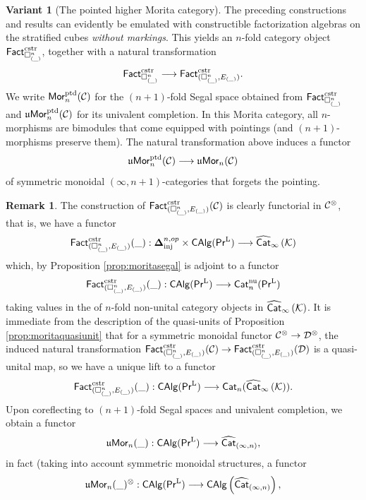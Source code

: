 \documentclass[10pt, reqno, twoside
, final
]{amsart}
\numberwithin{equation}{subsection}%
\theoremstyle{definition}
\theoremstyle{definition}
\theoremstyle{definition}
\theoremstyle{definition}
\theoremstyle{definition}
\theoremstyle{definition}
\theoremstyle{definition}
\newtheorem{var}[defn]{Variant}
\theoremstyle{definition}
\theoremstyle{definition}
\theoremstyle{plain}
\theoremstyle{definition}
\theoremstyle{plain}
\theoremstyle{definition}
\theoremstyle{plain}
\theoremstyle{definition}
\newtheorem{rmk}[defn]{Remark}
\theoremstyle{definition}
\theoremstyle{plain}
\theoremstyle{plain}
\theoremstyle{definition}
\theoremstyle{plain}
\theoremstyle{plain}
\theoremstyle{plain}
\begin{document}
\begin{var}[The pointed higher Morita category]
The preceding constructions and results can evidently be emulated with constructible factorization algebras on the stratified cubes \emph{without markings}. This yields an $n$-fold category object $\mathsf{Fact}^{\mathrm{cstr}}_{\square^n_{(\_)}}$, together with a natural transformation  
\[ \mathsf{Fact}^{\mathrm{cstr}}_{\square^n_{(\_)}}\longrightarrow  \mathsf{Fact}^{\mathrm{cstr}}_{(\square^n_{(\_)},E_{(\_)})}.  \]    
We write $\mathsf{Mor}^{\mathrm{ptd}}_n(\mathcal{C})$ for the $(n+1)$-fold Segal space obtained from $\mathsf{Fact}^{\mathrm{cstr}}_{\square^n_{(\_)}}$ and $\mathfrak{u}\mathsf{Mor}_n^{\mathrm{ptd}}(\mathcal{C})$ for its univalent completion. In this Morita category, all $n$-morphisms are bimodules that come equipped with pointings (and $(n+1)$-morphisms preserve them). The natural transformation above induces a functor 
\[ \mathfrak{u}\mathsf{Mor}^{\mathrm{ptd}}_n(\mathcal{C})\longrightarrow\mathfrak{u}\mathsf{Mor}_n(\mathcal{C})  \]
of symmetric monoidal $(\infty,n+1)$-categories that forgets the pointing.
\end{var}
\begin{rmk}
The construction of $\mathsf{Fact}^{\mathrm{cstr}}_{(\square^n_{(\_)},E_{(\_)}) }(\mathcal{C})$ is clearly functorial in $\mathcal{C}^{\otimes}$, that is, we have a functor
\[\mathsf{Fact}^{\mathrm{cstr}}_{(\square^n_{(\_)},E_{(\_)}) }(\_): \boldsymbol{\Delta}^{n,op}_{\mathrm{inj}}\times  \mathsf{CAlg}(\mathsf{Pr}^{\mathrm{L}})\longrightarrow \widehat{\mathsf{Cat}}_{\infty}\left(\mathcal{K}\right) \]
which, by Proposition \ref{prop:moritasegal} is adjoint to a functor
\[  \mathsf{Fact}^{\mathrm{cstr}}_{(\square^n_{(\_)},E_{(\_)}) }(\_):\mathsf{CAlg}(\mathsf{Pr}^{\mathrm{L}})\longrightarrow \mathsf{Cat}^{\mathrm{nu}}_n(\mathsf{Pr}^{\mathrm{L}}) \]
taking values in the \infcat of $n$-fold non-unital category objects in $\widehat{\mathsf{Cat}}_{\infty}\left(\mathcal{K}\right)$. 
It is immediate from the description of the quasi-units of Proposition \ref{prop:moritaquasiunit} that for a symmetric monoidal functor $\mathcal{C}^{\otimes}\rightarrow\mathcal{D}^{\otimes}$, the induced natural transformation $\mathsf{Fact}^{\mathrm{cstr}}_{(\square^n_{(\_)},E_{(\_)}) }(\mathcal{C})\rightarrow \mathsf{Fact}^{\mathrm{cstr}}_{(\square^n_{(\_)},E_{(\_)}) }(\mathcal{D})$ is a quasi-unital map, so we have a unique lift to a functor
\[  \mathsf{Fact}^{\mathrm{cstr}}_{(\square^n_{(\_)},E_{(\_)}) }(\_): \mathsf{CAlg}(\mathsf{Pr}^{\mathrm{L}})\longrightarrow \mathsf{Cat}_n(\widehat{\mathsf{Cat}}_{\infty}\left(\mathcal{K}\right)).  \] 
Upon coreflecting to $(n+1)$-fold Segal spaces and univalent completion, we obtain a functor
\[ \mathfrak{u}\mathsf{Mor}_n(\_): \mathsf{CAlg}(\mathsf{Pr}^{\mathrm{L}})\longrightarrow \widehat{\mathsf{Cat}}_{(\infty,n)}, \]
in fact (taking into account symmetric monoidal structures, a functor
\[ \mathfrak{u}\mathsf{Mor}_n(\_)^{\otimes}: \mathsf{CAlg}(\mathsf{Pr}^{\mathrm{L}})\longrightarrow \mathsf{CAlg}\left(\widehat{\mathsf{Cat}}_{(\infty,n)}\right), \]
\end{rmk}
 
\end{document}
